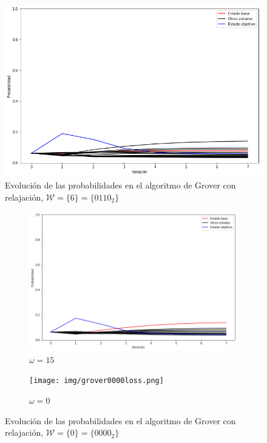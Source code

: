 \begin{figure}[H]
    \centering
    \includegraphics[width=0.75\linewidth]{img/grover0110loss.png}
    \caption[Evolución de las probabilidades en el algoritmo de Grover con relajación, $\mathcal{W} = \{6\}$]{Evolución de las probabilidades en el algoritmo de Grover con relajación, $\mathcal{W} = \{6\} = \{0110_2\}$}
    \label{fig:groverloss0110}
\end{figure}

\begin{figure}[H]
    \centering
    \begin{subfigure}[m]{0.49\textwidth}
        \centering
        \includegraphics[width=0.99\linewidth]{img/groverallloss.png}
        \caption{$\omega = 15$}
    \end{subfigure}
    \begin{subfigure}[m]{0.49\textwidth}
        \centering
        \texttt{[image: img/grover0000loss.png]}
        \caption{$\omega = 0$}
    \end{subfigure}
    \caption[Evolución de las probabilidades en el algoritmo de Grover con relajación, $\mathcal{W} = \{0\}$]{Evolución de las probabilidades en el algoritmo de Grover con relajación, $\mathcal{W} = \{0\} = \{0000_2\}$}
    \label{fig:groverloss0000}
\end{figure}

